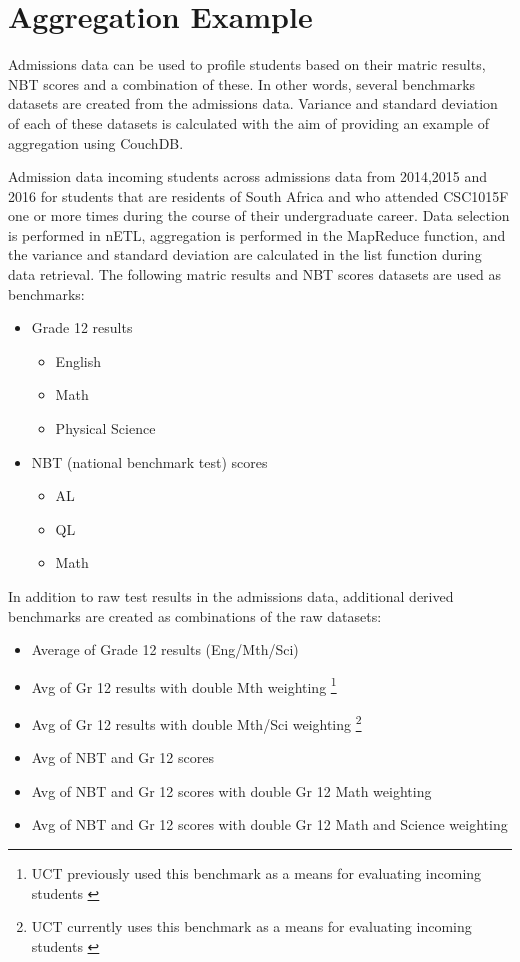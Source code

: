 \section{Aggregation Example}
Admissions data can be used to profile students based on their matric results, NBT scores and a combination of these. In other words, several benchmarks datasets are created from the admissions data. Variance and standard deviation of each of these datasets is calculated with the aim of providing an example of aggregation using CouchDB.

Admission data incoming students across admissions data from 2014,2015 and 2016 for students that are residents of South Africa and who attended CSC1015F one or more times during the course of their undergraduate career. Data selection is performed in nETL, aggregation is performed in the MapReduce function, and the variance and standard deviation are calculated in the list function during data retrieval. The following matric results and NBT scores datasets are used as benchmarks:

\begin{itemize}
  \item Grade 12 results
        \begin{itemize}
          \item English
          \item Math
          \item Physical Science
        \end{itemize}
  \item NBT (national benchmark test) scores
        \begin{itemize}
          \item AL
          \item QL
          \item Math
        \end{itemize}
\end{itemize}

In addition to raw test results in the admissions data, additional derived benchmarks are created as combinations of the raw datasets:

\begin{itemize}
  \item Average of Grade 12 results (Eng/Mth/Sci)
  \item Avg of Gr 12 results with double Mth weighting \footnote{UCT previously used this benchmark as a means for evaluating incoming students \cite{sonia2018}}
  \item Avg of Gr 12 results with double Mth/Sci weighting \footnote{UCT currently uses this benchmark as a means for evaluating incoming students \cite{sonia2018}}
  \item Avg of NBT and Gr 12 scores
  \item Avg of NBT and Gr 12 scores with double Gr 12 Math weighting
  \item Avg of NBT and Gr 12 scores with double Gr 12 Math and Science weighting
\end{itemize}


